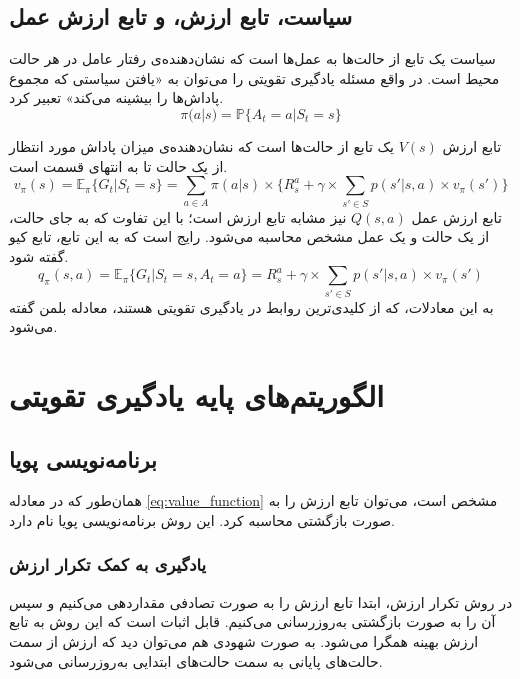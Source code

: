 \subsection{سیاست، تابع ارزش، و تابع ارزش عمل}
سیاست
یک تابع از حالت‌ها به عمل‌ها است که نشان‌دهنده‌ی رفتار عامل در هر حالت محیط است.
در واقع مسئله یادگیری تقویتی را می‌توان به «یافتن سیاستی که مجموع پاداش‌ها را بیشینه می‌کند» تعبیر کرد.
\begin{equation}\label{eq:policy}
    \pi(a|s) = \mathbb{P}\{A_t = a | S_t = s\}
\end{equation}

تابع ارزش $V(s)$
یک تابع از حالت‌ها است که نشان‌دهنده‌ی میزان پاداش مورد انتظار از یک حالت تا به انتهای قسمت است.
\begin{equation}\label{eq:value_function}
    v_\pi(s) = \mathbb{E}_\pi\{G_t | S_t = s\} = \sum_{a \in A}\pi(a|s)\times\{R_s^a + \gamma \times \sum_{s' \in S}p(s'|s,a)\times v_\pi(s')\}
\end{equation}
تابع ارزش عمل $Q(s, a)$
نیز مشابه تابع ارزش است؛ با این تفاوت که به جای حالت، از یک حالت و یک عمل مشخص محاسبه می‌شود. رایج است که به این تابع، تابع کیو گفته شود.
\begin{equation}\label{eq:q_function}
    q_\pi(s,a) = \mathbb{E}_\pi\{G_t | S_t = s, A_t = a\} = R_s^a + \gamma \times \sum_{s' \in S}p(s'|s,a)\times v_\pi(s')
\end{equation}
به این معادلات، که از کلیدی‌ترین روابط در یادگیری تقویتی هستند، معادله بلمن گفته می‌شود.
\section{الگوریتم‌های پایه یادگیری تقویتی}
\subsection{برنامه‌نویسی پویا}
همان‌طور که در معادله \ref{eq:value_function} مشخص است، می‌توان تابع ارزش را به صورت بازگشتی محاسبه کرد.
این روش برنامه‌نویسی پویا
نام دارد.
\subsubsection{یادگیری به کمک تکرار ارزش}
در روش تکرار ارزش،
 ابتدا تابع ارزش را به صورت تصادفی مقداردهی می‌کنیم و سپس آن را به صورت بازگشتی به‌روز‌رسانی می‌کنیم.
قابل اثبات است که این روش به تابع ارزش بهینه همگرا می‌شود\cite{howard1960dynamic}.
به صورت شهودی هم می‌توان دید که ارزش از سمت حالت‌های پایانی به سمت حالت‌های ابتدایی به‌روز‌رسانی می‌شود.
